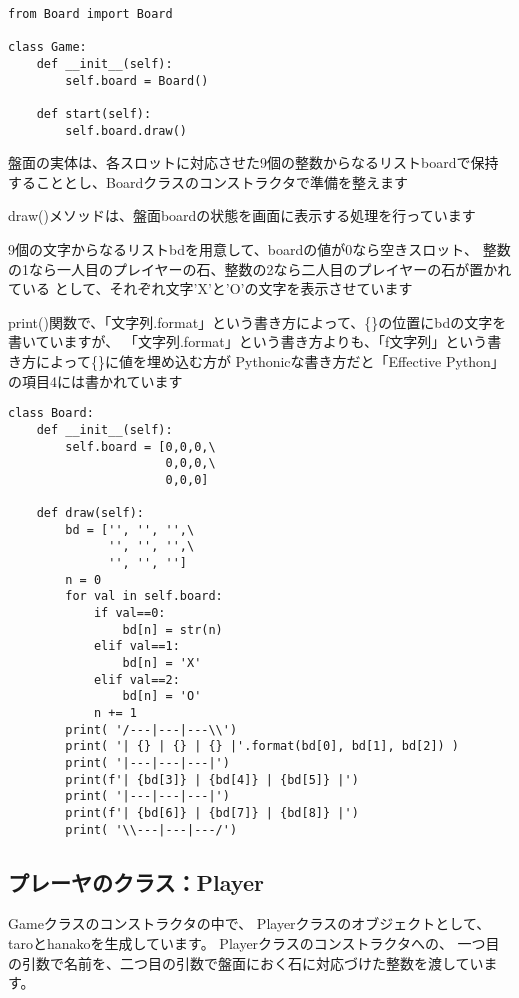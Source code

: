 \documentclass[uplatex,a4paper,11pt,oneside,openany]{jsbook}
\begin{document}
\begin{lstlisting}[caption=class Game,label=prog02-1]
from Board import Board

class Game:
    def __init__(self):
        self.board = Board()

    def start(self):
        self.board.draw()
\end{lstlisting}%

盤面の実体は、各スロットに対応させた9個の整数からなるリストboardで保持することとし、Boardクラスのコンストラクタで準備を整えます

draw()メソッドは、盤面boardの状態を画面に表示する処理を行っています

9個の文字からなるリストbdを用意して、boardの値が0なら空きスロット、
整数の1なら一人目のプレイヤーの石、整数の2なら二人目のプレイヤーの石が置かれている
として、それぞれ文字'X'と'O'の文字を表示させています

print()関数で、「文字列.format」という書き方によって、\{\}の位置にbdの文字を書いていますが、
「文字列.format」という書き方よりも、「f文字列」という書き方によって\{\}に値を埋め込む方が
Pythonicな書き方だと「Effective Python」の項目4には書かれています

\begin{lstlisting}[caption=class Board,label=prog02-2]
class Board:
    def __init__(self):
        self.board = [0,0,0,\
                      0,0,0,\
                      0,0,0]

    def draw(self):
        bd = ['', '', '',\
              '', '', '',\
              '', '', '']
        n = 0
        for val in self.board:
            if val==0:
                bd[n] = str(n)
            elif val==1:
                bd[n] = 'X'
            elif val==2:
                bd[n] = 'O'
            n += 1
        print( '/---|---|---\\')
        print( '| {} | {} | {} |'.format(bd[0], bd[1], bd[2]) )
        print( '|---|---|---|')
        print(f'| {bd[3]} | {bd[4]} | {bd[5]} |')
        print( '|---|---|---|')
        print(f'| {bd[6]} | {bd[7]} | {bd[8]} |')
        print( '\\---|---|---/')
\end{lstlisting}%

\subsection{プレーヤのクラス：Player}

Gameクラスのコンストラクタの中で、
Playerクラスのオブジェクトとして、taroとhanakoを生成しています。
Playerクラスのコンストラクタへの、
一つ目の引数で名前を、二つ目の引数で盤面におく石に対応づけた整数を渡しています。
\end{document}
